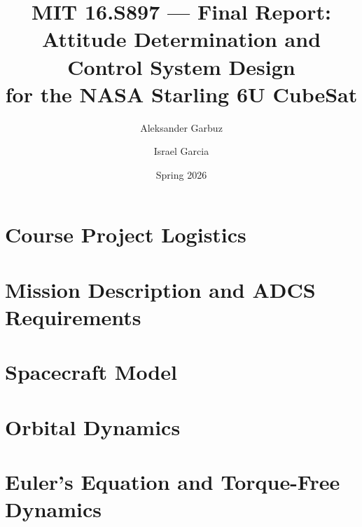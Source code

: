 \documentclass[11pt]{article}
\title{MIT 16.S897 --- Final Report:\\
       Attitude Determination and Control System Design\\
       for the NASA Starling 6U CubeSat}
\author{Aleksander Garbuz \and Israel Garcia}
\date{Spring 2026}
\begin{document}
\maketitle
\tableofcontents
\newpage

\section{Course Project Logistics}

\section{Mission Description and ADCS Requirements}

\section{Spacecraft Model}

\section{Orbital Dynamics}


\section{Euler's Equation and Torque-Free Dynamics}

\end{document}

